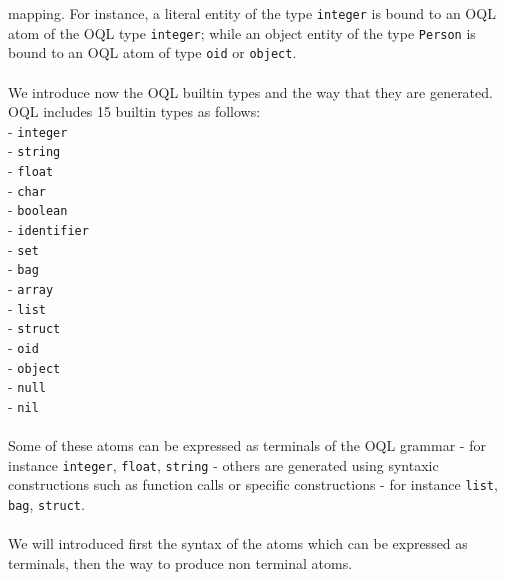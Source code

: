mapping. For instance, a literal entity of the \eyedb type \texttt{integer}
is bound to an OQL atom of the OQL type \texttt{integer}; while an
object entity of the \eyedb type \texttt{Person} is bound to an OQL atom
of type \texttt{oid} or \texttt{object}.
\\
\\
We introduce now the OQL builtin types and the way that they are generated.
OQL includes 15 builtin types as follows:\\
\ixy - \texttt{integer}\\
\ixy - \texttt{string}\\
\ixy - \texttt{float}\\
\ixy - \texttt{char}\\
\ixy - \texttt{boolean}\\
\ixy - \texttt{identifier}\\
\ixy - \texttt{set}\\
\ixy - \texttt{bag}\\
\ixy - \texttt{array}\\
\ixy - \texttt{list}\\
\ixy - \texttt{struct}\\
\ixy - \texttt{oid}\\
\ixy - \texttt{object}\\
\ixy - \texttt{null}\\
\ixy - \texttt{nil}\\
\\
Some of these atoms can be expressed as terminals of the OQL grammar - for
instance \texttt{integer}, \texttt{float}, \texttt{string} - others are
generated using syntaxic constructions such as function calls or specific
constructions - for instance \texttt{list}, \texttt{bag}, \texttt{struct}.
\\
\\
We will introduced first the syntax of the atoms which can be expressed
as terminals, then the way to produce non terminal atoms.

